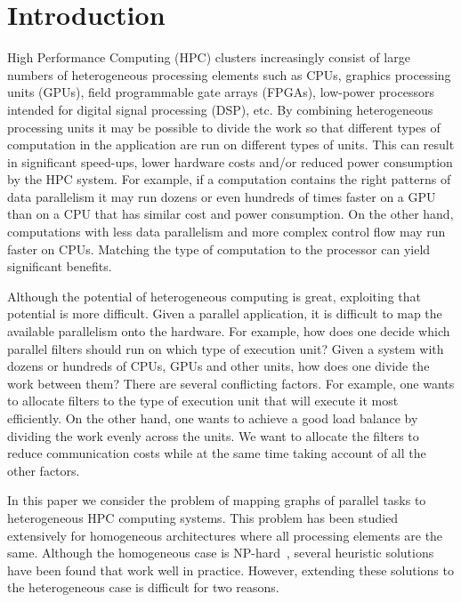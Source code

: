 \section{Introduction}
\label{sec:introduction}

High Performance Computing (HPC) clusters increasingly consist of large numbers
of heterogeneous
processing elements such as CPUs, graphics processing units (GPUs),
field programmable gate arrays (FPGAs), low-power processors intended
for digital signal processing (DSP), etc. By combining heterogeneous
processing units it may be possible to divide the work so that different
types of computation in the application are run on different types of
units. This can result in significant speed-ups, lower hardware costs
and/or reduced power consumption by the HPC system.  For example, if a
computation contains the right patterns of data parallelism it may run
dozens or even hundreds of times faster on a GPU than on a CPU that has
similar cost and power consumption. On the other hand, computations with
less data parallelism and more complex control flow may run faster on
CPUs. Matching the type of computation to the processor can yield
significant benefits.

Although the potential of heterogeneous computing is great, exploiting
that potential is more difficult. Given a parallel application, it is
difficult to map the available parallelism onto the hardware. For
example, how does one decide which parallel filters should run on which
type of execution unit? Given a system with dozens or hundreds of CPUs,
GPUs and other units, how does one divide the work between them?  There
are several conflicting factors. For example, one wants to allocate
filters to the type of execution unit that will execute it most
efficiently. On the other hand, one wants to achieve a good load balance
by dividing the work evenly across the units. %
We want to allocate the filters to reduce communication costs while at the
same time taking account of all the other factors.

In this paper we consider the problem of mapping graphs of parallel
tasks to heterogeneous HPC computing systems. This problem has been
studied extensively for homogeneous architectures where all processing
elements are the same. Although the homogeneous case is
NP-hard~\cite{vsar89}, several heuristic solutions have been found that
work well in practice. However, extending these solutions to the
heterogeneous case is difficult for two reasons.

